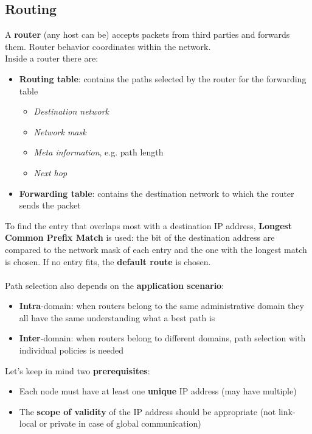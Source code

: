 \newpage
\subsection{Routing}
A \textbf{router} (any host can be) accepts packets from third parties and forwards them. Router behavior coordinates within the network.\\
Inside a router there are:
\begin{itemize}
	\item \textbf{Routing table}: contains the paths selected by the router for the forwarding table
	\begin{itemize}
		\item \textit{Destination network}
		\item \textit{Network mask}
		\item \textit{Meta information}, e.g. path length
		\item \textit{Next hop}
	\end{itemize}
	\item \textbf{Forwarding table}: contains the destination network to which the router sends the packet
\end{itemize}
To find the entry that overlaps most with a destination IP address, \textbf{Longest Common Prefix Match} is used: the bit of the destination address are compared to the network mask of each entry and the one with the longest match is chosen. If no entry fits, the \textbf{default route} is chosen.\\\\
Path selection also depends on the \textbf{application scenario}:
\begin{itemize}
	\item \textbf{Intra}-domain: when routers belong to the same administrative domain they  all have the same understanding what a best path is
	\item \textbf{Inter}-domain: when routers belong to different domains, path selection with individual policies is needed
\end{itemize}

\begin{note}
	Let's keep in mind two \textbf{prerequisites}:
	\begin{itemize}
		\item Each node must have at least one \textbf{unique} IP address (may have multiple)
		\item The \textbf{scope of validity} of the IP address should be appropriate (not link-local or private in case of global communication)
	\end{itemize}
\end{note}

